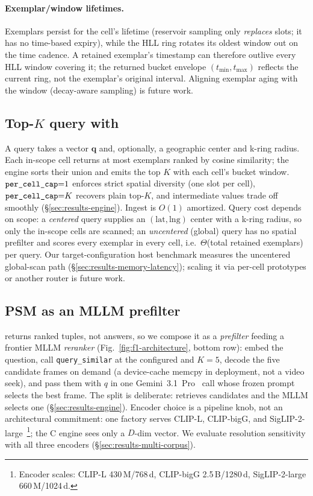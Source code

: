 \paragraph{Exemplar/window lifetimes.} Exemplars persist for the cell's lifetime
(reservoir sampling only \emph{replaces} slots; it has no time-based expiry),
while the HLL ring rotates its oldest window out on the time cadence. A retained
exemplar's timestamp can therefore outlive every HLL window covering it; the
returned bucket envelope $(t_{\min},t_{\max})$ reflects the current ring, not the
exemplar's original interval. Aligning exemplar aging with the window (decay-aware
sampling) is future work.

\subsection{Top-$K$ query with \caponek}
\label{sec:method-query}

A query takes a vector $\mathbf{q}$ and, optionally, a geographic center and
k-ring radius. Each in-scope cell returns at most \caponek{} exemplars ranked by
cosine similarity; the engine sorts their union and emits the top $K$ with each
cell's bucket window. $\texttt{per\_cell\_cap}{=}1$ enforces strict spatial diversity
(one slot per cell), $\texttt{per\_cell\_cap}{=}K$ recovers plain top-$K$, and intermediate
values trade off smoothly (\S\ref{sec:results-engine}). Ingest is
$O(1)$ amortized. Query cost depends on scope: a \emph{centered} query supplies an
$(\mathrm{lat},\mathrm{lng})$ center with a k-ring radius, so only the in-scope
cells are scanned; an \emph{uncentered} (global) query has no spatial prefilter
and scores every exemplar in every cell, i.e.\ $\Theta$(total retained
exemplars) per query. Our target-configuration host benchmark measures the
uncentered global-scan path (\S\ref{sec:results-memory-latency}); scaling it via
per-cell prototypes or another router is future work.

\subsection{PSM as an MLLM prefilter}
\label{sec:pipeline}
\psm{} returns ranked tuples, not answers, so we compose it as a
\emph{prefilter} feeding a frontier MLLM \emph{reranker}
(Fig.~\ref{fig:f1-architecture}, bottom row): embed the question, call
\texttt{query\_similar} at the configured \caponek{} and $K{=}5$, decode the five
candidate frames on demand (a device-cache memcpy in deployment, not a video
seek), and pass them with $q$ in one Gemini~3.1~Pro~\cite{google2026gemini} call
whose frozen prompt selects the best frame. The split is deliberate: \psm{}
retrieves candidates and the MLLM selects one (\S\ref{sec:results-engine}).
Encoder choice is a pipeline knob, not an
architectural commitment: one factory serves CLIP-L, CLIP-bigG, and
SigLIP-2-large~\cite{tschannen2025siglip2}\footnote{Encoder scales: CLIP-L
430\,M/768\,d, CLIP-bigG 2.5\,B/1280\,d, SigLIP-2-large 660\,M/1024\,d.}; the C
engine sees only a $D$-dim vector. We evaluate resolution sensitivity with all
three encoders (\S\ref{sec:results-multi-corpus}).
